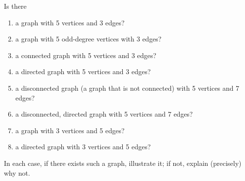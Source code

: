 \documentclass[10pt]{article}
\newenvironment{problem}[2][Problem]{\begin{trivlist}
\item[\hskip \labelsep {\bfseries #1}\hskip \labelsep {\bfseries #2.}]}{\end{trivlist}}
\begin{document}
\pagebreak
\pagebreak
\newpage
\clearpage
\begin{problem}{3}
Is there
\begin{enumerate}
    \parskip=0in
    \parsep=0in
    \itemsep=0.1in
    \item a graph with 5 vertices and 3 edges?
    \item a graph with 5 odd-degree vertices with 3 edges?
    \item a connected graph with 5 vertices and 3 edges?
    \item a directed graph with 5 vertices and 3 edges?
    \item a disconnected graph (a graph that is not connected) with 5
vertices and 7 edges?
    \item a disconnected, directed graph with 5 vertices and 7 edges?
    \item a graph with 3 vertices and 5 edges?
    \item a directed graph with 3 vertices and 5 edges?
\end{enumerate}

In each case, if there exists such a graph, illustrate it; if not, explain (precisely) why not.
\end{problem}
\end{document}
